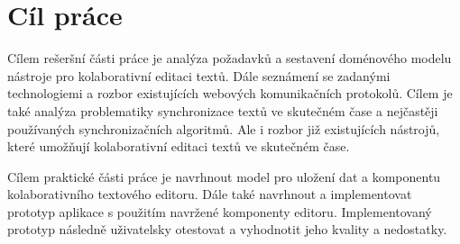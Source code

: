 
\chapter{Cíl práce}\label{ch:cílPráce}

Cílem rešeršní části práce je analýza požadavků a sestavení doménového modelu nástroje pro kolaborativní editaci textů.
Dále seznámení se zadanými technologiemi a rozbor existujících webových komunikačních protokolů.
Cílem je také analýza problematiky synchronizace textů ve skutečném čase a nejčastěji používaných synchronizačních algoritmů.
Ale i rozbor již existujících nástrojů, které umožňují kolaborativní editaci textů ve skutečném čase.




Cílem praktické části práce je navrhnout model pro uložení dat a komponentu kolaborativního textového editoru.
Dále také navrhnout a implementovat prototyp aplikace s použitím navržené komponenty editoru.
Implementovaný prototyp následně uživatelsky otestovat a vyhodnotit jeho kvality a nedostatky.

